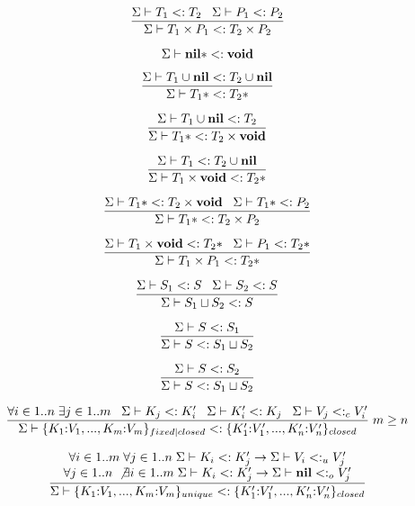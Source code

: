 \[
\dfrac{\Sigma \vdash T_{1} <: T_{2} \;\;\;
       \Sigma \vdash P_{1} <: P_{2}}
      {\Sigma \vdash T_{1} \times P_{1} <: T_{2} \times P_{2}}
\]

\[
\Sigma \vdash \mathbf{nil}{*} <: \mathbf{void}
\]

\[
\dfrac{\Sigma \vdash T_{1} \cup \mathbf{nil} <: T_{2} \cup \mathbf{nil}}
      {\Sigma \vdash T_{1}{*} <: T_{2}{*}}
\]

\[
\dfrac{\Sigma \vdash T_{1} \cup \mathbf{nil} <: T_{2}}
      {\Sigma \vdash T_{1}{*} <: T_{2} \times \mathbf{void}}
\]

\[
\dfrac{\Sigma \vdash T_{1} <: T_{2} \cup \mathbf{nil}}
      {\Sigma \vdash T_{1} \times \mathbf{void} <: T_{2}{*}}
\]

\[
\dfrac{\Sigma \vdash T_{1}{*} <: T_{2} \times \mathbf{void} \;\;\;
       \Sigma \vdash T_{1}{*} <: P_{2}}
      {\Sigma \vdash T_{1}{*} <: T_{2} \times P_{2}}
\]

\[
\dfrac{\Sigma \vdash T_{1} \times \mathbf{void} <: T_{2}{*} \;\;\;
       \Sigma \vdash P_{1} <: T_{2}{*}}
      {\Sigma \vdash T_{1} \times P_{1} <: T_{2}{*}}
\]

\[
\dfrac{\Sigma \vdash S_{1} <: S \;\;\;
       \Sigma \vdash S_{2} <: S}
      {\Sigma \vdash S_{1} \sqcup S_{2} <: S}
\]

\[
\dfrac{\Sigma \vdash S <: S_{1}}
      {\Sigma \vdash S <: S_{1} \sqcup S_{2}}
\]

\[
\dfrac{\Sigma \vdash S <: S_{2}}
      {\Sigma \vdash S <: S_{1} \sqcup S_{2}}
\]

\[
\dfrac{\forall i \in 1..n \; \exists j \in 1..m \;\;\;
       \Sigma \vdash K_{j} <: K_{i}' \;\;\;
       \Sigma \vdash K_{i}' <: K_{j} \;\;\;
       \Sigma \vdash V_{j} <:_{c} V_{i}'}
      {\Sigma \vdash \{K_{1}{:}V_{1}, ..., K_{m}{:}V_{m}\}_{fixed|closed} <:
                    \{K_{1}'{:}V_{1}', ..., K_{n}'{:}V_{n}'\}_{closed}} \; m \ge n
\]

\[
\dfrac{\begin{array}{c}
       \forall i \in 1..m \; \forall j \in 1..n \;
       \Sigma \vdash K_{i} <: K_{j}' \to \Sigma \vdash V_{i} <:_{u} V_{j}' \\
       \forall j \in 1..n \; \not\exists i \in 1..m \;
       \Sigma \vdash K_{i} <: K_{j}' \to \Sigma \vdash \mathbf{nil} <:_{o} V_{j}'
       \end{array}}
      {\Sigma \vdash \{K_{1}{:}V_{1}, ..., K_{m}{:}V_{m}\}_{unique} <:
                    \{K_{1}'{:}V_{1}', ..., K_{n}'{:}V_{n}'\}_{closed}}
\]

